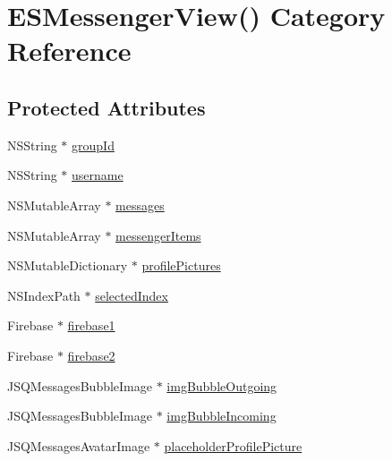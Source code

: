 \hypertarget{category_e_s_messenger_view_07_08}{}\section{E\+S\+Messenger\+View() Category Reference}
\label{category_e_s_messenger_view_07_08}
\subsection*{Protected Attributes}
\begin{DoxyCompactItemize}
\item 
N\+S\+String $\ast$ \hyperlink{category_e_s_messenger_view_07_08_afbb8227a34b74d5383e4d34a99ced891}{group\+Id}
\item 
N\+S\+String $\ast$ \hyperlink{category_e_s_messenger_view_07_08_a59c65c6e1e6019569ca8a58e7da563de}{username}
\item 
N\+S\+Mutable\+Array $\ast$ \hyperlink{category_e_s_messenger_view_07_08_aede1b4ed3fb7cab93c4af78c96cb2c09}{messages}
\item 
N\+S\+Mutable\+Array $\ast$ \hyperlink{category_e_s_messenger_view_07_08_a6c95942e4427224197a29849682f374a}{messenger\+Items}
\item 
N\+S\+Mutable\+Dictionary $\ast$ \hyperlink{category_e_s_messenger_view_07_08_add298c7e0599ca792f67afe524bdf3d2}{profile\+Pictures}
\item 
N\+S\+Index\+Path $\ast$ \hyperlink{category_e_s_messenger_view_07_08_a11c09575d840699174290d09551b78f5}{selected\+Index}
\item 
Firebase $\ast$ \hyperlink{category_e_s_messenger_view_07_08_a9fbd9f22e2fbded3d4f28b5f2c07affb}{firebase1}
\item 
Firebase $\ast$ \hyperlink{category_e_s_messenger_view_07_08_a0de899dba26c0fa82baa958ff2669b26}{firebase2}
\item 
J\+S\+Q\+Messages\+Bubble\+Image $\ast$ \hyperlink{category_e_s_messenger_view_07_08_a4fe45fd933c5757bca192e741ca58405}{img\+Bubble\+Outgoing}
\item 
J\+S\+Q\+Messages\+Bubble\+Image $\ast$ \hyperlink{category_e_s_messenger_view_07_08_a074b59250004158658de40929bcd56c4}{img\+Bubble\+Incoming}
\item 
J\+S\+Q\+Messages\+Avatar\+Image $\ast$ \hyperlink{category_e_s_messenger_view_07_08_a80d4d7c99145b51c56e260655416ad7b}{placeholder\+Profile\+Picture}
\end{DoxyCompactItemize}


